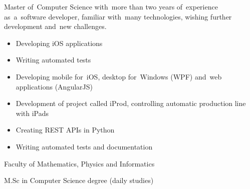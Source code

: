 \documentclass[11pt,a4paper]{article}
\begin{document}
    \bigskip


    \smallskip

    \noindent
    Master of~Computer Science with~more than two years of~experience as~a~software developer, familiar with~many technologies, wishing further development and~new challenges.


    \bigskip


    \smallskip

    \vspace{-0.2cm}
    \begin{itemize} \itemsep1pt \parskip0pt 
        \item Developing iOS applications
        \item Writing automated tests
    \end{itemize}
    \vspace{-0.2cm}
    \vspace{-0.2cm}
    \begin{itemize} \itemsep1pt \parskip0pt 
        \item Developing mobile for~iOS, desktop for~Windows (WPF) and~web applications (AngularJS)
        \item Development of project called iProd, controlling automatic production line with iPads
        \item Creating REST APIs in Python
        \item Writing automated tests and documentation
    \end{itemize}

  
    \vspace{0.5cm}
  
    \medskip
    \vspace{-1.6mm}
    \begin{description} \itemsep0pt \parskip0pt 
        \item[ ] Faculty of Mathematics, Physics and Informatics
        \item[ ] M.Sc in Computer Science degree (daily studies)
    \end{description}
  
\end{document}
